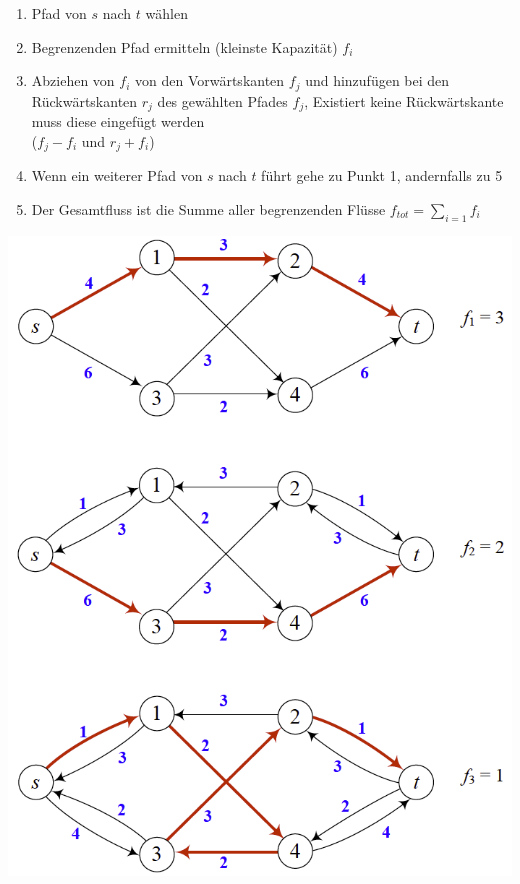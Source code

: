 \begin{minipage}{0.7\textwidth}
	\begin{enumerate}
		\item Pfad von $s$ nach $t$ wählen
		\item Begrenzenden Pfad ermitteln (kleinste Kapazität) $f_i$
		\item Abziehen von $f_i$ von den Vorwärtskanten $f_j$ und hinzufügen bei den Rückwärtskanten $r_j$ des gewählten Pfades $f_j$, Existiert keine Rückwärtskante muss diese eingefügt werden\\ ($f_j-f_i$ und $r_j + f_i$)
		\item Wenn ein weiterer Pfad von $s$ nach $t$ führt gehe zu  Punkt 1, andernfalls zu 5
		\item Der Gesamtfluss ist die Summe aller begrenzenden Flüsse $f_{tot} = \sum_{i=1} f_i$
	\end{enumerate}
\end{minipage}
\begin{minipage}{0.3\textwidth}
	\includegraphics[width=\textwidth]{Content/Graphen/FordFulkerson.png}
\end{minipage}



